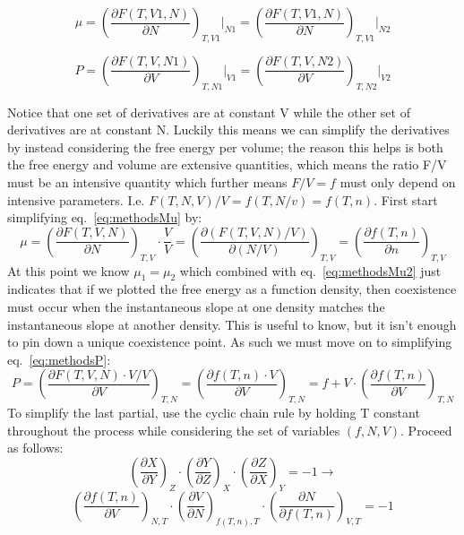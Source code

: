 \begin{equation}\label{eq:methodsMu}
\mu=\left(\frac{\partial F(T,V1,N)}{\partial N}\right)_{T,V1}\Bigr|_{N1}=\left(\frac{\partial F(T,V1,N)}{\partial N}\right)_{T,V1}\Bigr|_{N2}
\end{equation}

\begin{equation}\label{eq:methodsP}
P=\left(\frac{\partial F(T,V,N1)}{\partial V}\right)_{T,N1}\Bigr|_{V1}=\left(\frac{\partial F(T,V,N2)}{\partial V}\right)_{T,N2}\Bigr|_{V2}
\end{equation}

Notice that one set of derivatives are at constant V while the other set of derivatives are at constant N. Luckily this means we can simplify the derivatives by instead considering the free energy per volume; the reason this helps is both the free energy and volume are extensive quantities, which means the ratio F/V must be an intensive quantity which further means $F/V=f$ must only depend on intensive parameters. I.e. $F(T,N,V)/V=f(T,N/v)=f(T,n)$. First start simplifying eq.~\ref{eq:methodsMu} by:
\begin{equation}\label{eq:methodsMu2}
\mu=\left(\frac{\partial F(T,V,N)}{\partial N}\right)_{T,V}\cdot\frac{V}{V}=\left(\frac{\partial (F(T,V,N)/V)}{\partial (N/V)}\right)_{T,V}=\left(\frac{\partial f(T,n)}{\partial n}\right)_{T,V}
\end{equation}
At this point we know $\mu_1=\mu_2$ which combined with eq.~\ref{eq:methodsMu2} just indicates that if we plotted the free energy as a function density, then coexistence must occur when the instantaneous slope at one density matches the instantaneous slope at another density. This is useful to know, but it isn't enough to pin down a unique coexistence point. As such we must move on to simplifying eq.~\ref{eq:methodsP}:
\begin{equation}\label{eq:methodsP2}
P=\left(\frac{\partial F(T,V,N)\cdot V/V}{\partial V}\right)_{T,N}=\left(\frac{\partial f(T,n)\cdot V}{\partial V}\right)_{T,N}=f+V\cdot\left(\frac{\partial f(T,n)}{\partial V}\right)_{T,N}
\end{equation}
To simplify the last partial, use the cyclic chain rule by holding T constant throughout the process while considering the set of variables $(f,N,V)$. Proceed as follows:
$$\left(\frac{\partial X}{\partial Y}\right)_Z\cdot \left(\frac{\partial Y}{\partial Z}\right)_X\cdot
\left(\frac{\partial Z}{\partial X}\right)_Y=-1 \rightarrow$$
\begin{equation}\label{eq:P3}
\left(\frac{\partial f(T,n)}{\partial V}\right)_{N,T} \cdot\left(\frac{\partial V}{\partial N}\right)_{f(T,n),T} \cdot\left(\frac{\partial N}{\partial f(T,n)}\right)_{V,T}=-1
\end{equation}
